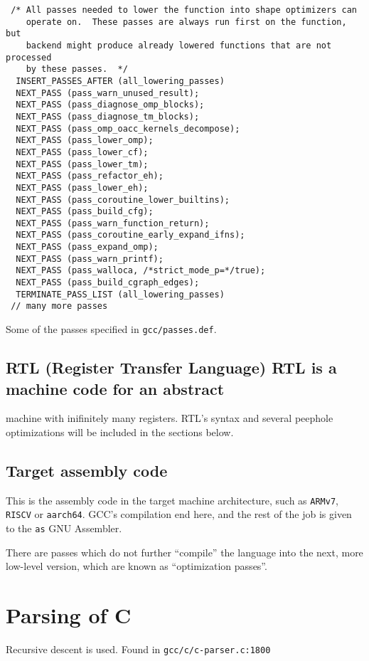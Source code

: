 \documentclass[11pt]{article}
\begin{document}
\begin{listing}[H]
\begin{verbatim}
 /* All passes needed to lower the function into shape optimizers can
    operate on.  These passes are always run first on the function, but
    backend might produce already lowered functions that are not processed
    by these passes.  */
  INSERT_PASSES_AFTER (all_lowering_passes)
  NEXT_PASS (pass_warn_unused_result);
  NEXT_PASS (pass_diagnose_omp_blocks);
  NEXT_PASS (pass_diagnose_tm_blocks);
  NEXT_PASS (pass_omp_oacc_kernels_decompose);
  NEXT_PASS (pass_lower_omp);
  NEXT_PASS (pass_lower_cf);
  NEXT_PASS (pass_lower_tm);
  NEXT_PASS (pass_refactor_eh);
  NEXT_PASS (pass_lower_eh);
  NEXT_PASS (pass_coroutine_lower_builtins);
  NEXT_PASS (pass_build_cfg);
  NEXT_PASS (pass_warn_function_return);
  NEXT_PASS (pass_coroutine_early_expand_ifns);
  NEXT_PASS (pass_expand_omp);
  NEXT_PASS (pass_warn_printf);
  NEXT_PASS (pass_walloca, /*strict_mode_p=*/true);
  NEXT_PASS (pass_build_cgraph_edges);
  TERMINATE_PASS_LIST (all_lowering_passes)
 // many more passes
\end{verbatim}
\caption{Some of the passes specified in \texttt{gcc/passes.def}.}
\end{listing}
\subsection{RTL (Register Transfer Language) RTL is a machine code for an abstract}
\label{sec:org1339166}
machine with inifinitely many registers. RTL's syntax and several peephole
optimizations will be included in the sections below.
\subsection{Target assembly code}
\label{sec:org2f3f902}
This is the assembly code in the target machine architecture, such as
\texttt{ARMv7}, \texttt{RISCV} or \texttt{aarch64}. GCC's compilation end here, and the rest of
the job is given to the \texttt{as} GNU Assembler.

There are passes which do not further ``compile'' the language into the next, more
low-level version, which are known as ``optimization passes''.
\section{Parsing of C}
\label{sec:orgca0061d}
Recursive descent is used. Found in \texttt{gcc/c/c-parser.c:1800}
\end{document}
